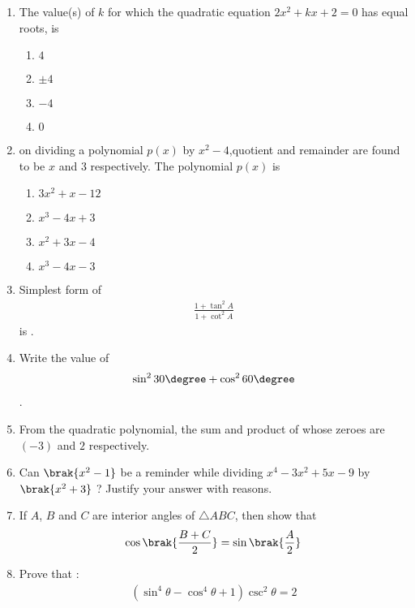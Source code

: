 \begin{enumerate}

\item The value(s) of $k$ for which the quadratic equation $2x^2 + kx + 2 = 0$ has equal roots, is 
\begin{enumerate}[label =(\Alph*)]
\item $4$ 
\item $\pm 4$
\item $-4$
\item $0$ 
\end{enumerate}
\item on dividing a polynomial $p(x)$ by $x^2 - 4$,quotient and remainder are found to be $x$ and $3$ respectively. The polynomial $p(x)$ is 
\begin{enumerate}[label =(\Alph*)]
\item $3x^2 + x - 12$
\item $x^3 - 4x + 3$
\item $x^2 + 3x - 4$
\item $x^3 - 4x - 3$
\end{enumerate}

\item Simplest form of 
 \begin{align}
     \frac{1 + \tan^{2}{A}}{1 + \cot^{2}{A}}
 \end{align}is .

\item Write the value of
 \begin{align}
	     \sin^{2}{30\degree} + \cos^{2}{60\degree}
	\end{align}.
\item From the quadratic polynomial, the sum and product  of whose zeroes are $(-3)$ and $2$ respectively.

\item Can $\brak{x^{2} - 1}$ be a reminder while dividing $x^{4} - 3x^{2} + 5x - 9$ by 
$\brak{x^{2}+3}$ ? Justify your answer with reasons.

\item If $A$, $B$ and $C$ are interior angles of $ \triangle ABC$, then show that
	\begin{align}
	    \cos \brak{\frac{B + C}{2}}=\sin \brak{\frac{A}{2}}
	\end{align}
      
\item Prove that : 
        \begin{align}
           (\sin^{4}{\theta} - \cos^{4}{\theta} + 1)\csc^{2}{\theta} = 2 
        \end{align}
  

\end{enumerate}
